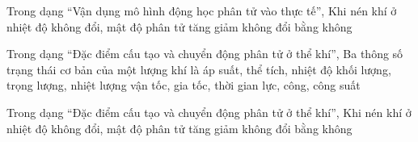 \begin{ex}
Trong dạng “Vận dụng mô hình động học phân tử vào thực tế”, Khi nén khí ở nhiệt độ không đổi, mật độ phân tử
\choice
{\True tăng}
{giảm}
{không đổi}
{bằng không}
\end{ex}

\begin{ex}
Trong dạng “Đặc điểm cấu tạo và chuyển động phân tử ở thể khí”, Ba thông số trạng thái cơ bản của một lượng khí là
\choice
{\True áp suất, thể tích, nhiệt độ}
{khối lượng, trọng lượng, nhiệt lượng}
{vận tốc, gia tốc, thời gian}
{lực, công, công suất}
\end{ex}

\begin{ex}
Trong dạng “Đặc điểm cấu tạo và chuyển động phân tử ở thể khí”, Khi nén khí ở nhiệt độ không đổi, mật độ phân tử
\choice
{\True tăng}
{giảm}
{không đổi}
{bằng không}
\end{ex}
